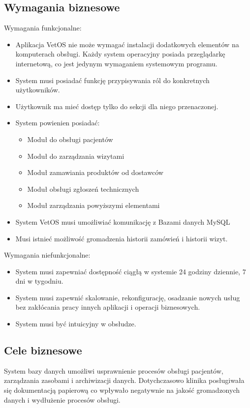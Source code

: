 \documentclass[10pt,a4paper]{article}
\begin{document}
	\subsection{Wymagania biznesowe}
	Wymagania funkcjonalne:
	\begin{itemize}
		\item Aplikacja VetOS nie może wymagać instalacji dodatkowych elementów na komputerach obsługi. Każdy system operacyjny posiada przeglądarkę internetową, co jest jedynym wymaganiem systemowym programu.
		\item System musi posiadać funkcję przypisywania ról do konkretnych użytkowników. 
		\item Użytkownik ma mieć dostęp tylko do sekcji dla niego przenaczonej. 
		\newpage
		\item System powienien posiadać:
			\begin{itemize}
				\item Moduł do obsługi pacjentów
				\item Moduł do zarządzania wizytami
				\item Moduł zamawiania produktów od dostawców
				\item Moduł obsługi zgłoszeń technicznych 
				\item Moduł zarządzania powyższymi elementami
			\end{itemize}
		\item System VetOS musi umożliwiać komunikację z Bazami danych MySQL
		\item Musi istnieć możliwość gromadzenia historii zamówień i historii wizyt.
	\end{itemize}
	Wymagania niefunkcjonalne:
	\begin{itemize}
		\item System musi zapewniać dostępność ciągłą w systemie 24 godziny dziennie, 7 dni w tygodniu.
		\item System musi zapewnić skalowanie, rekonfigurację, osadzanie nowych usług bez zakłócania pracy innych aplikacji i operacji biznesowych.
		\item System musi być intuicyjny w obsłudze.
	\end{itemize}

	\subsection{Cele biznesowe}
	System bazy danych umożliwi usprawnienie procesów obsługi pacjentów, zarządzania zasobami i archiwizacji danych. Dotychczasowo klinika posługiwała się dokumentacją papierową co wpływało negatywnie na jakość gromadzonych danych i wydłużenie procesów obsługi.
	
\end{document}
